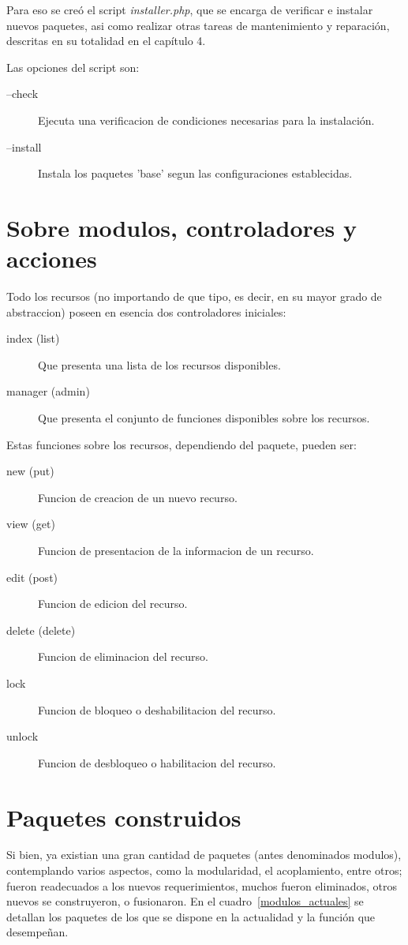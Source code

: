 Para eso se creó el script \emph{installer.php}, que se encarga de verificar e instalar nuevos paquetes, asi como
realizar otras tareas de mantenimiento y reparación, descritas en su totalidad en el capítulo 4.

Las opciones del script son:

\begin{description}
\item [--check] Ejecuta una verificacion de condiciones necesarias para la instalación.
\item [--install] Instala los paquetes 'base' segun las configuraciones establecidas.
\end{description}

\section{Sobre modulos, controladores y acciones}
Todo los recursos (no importando de que tipo, es decir, en su mayor grado de abstraccion) poseen en esencia dos
controladores iniciales:

\begin{description}
\item [index (list)] Que presenta una lista de los recursos disponibles.
\item [manager (admin)] Que presenta el conjunto de funciones disponibles sobre los recursos.
\end{description}

Estas funciones sobre los recursos, dependiendo del paquete, pueden ser:

\begin{description}
\item [new (put)] Funcion de creacion de un nuevo recurso.
\item [view (get)] Funcion de presentacion de la informacion de un recurso.
\item [edit (post)] Funcion de edicion del recurso.
\item [delete (delete)] Funcion de eliminacion del recurso.
\item [lock] Funcion de bloqueo o deshabilitacion del recurso.
\item [unlock] Funcion de desbloqueo o habilitacion del recurso.
\end{description}

\section{Paquetes construidos}
Si bien, ya existian una gran cantidad de paquetes (antes denominados modulos), contemplando varios aspectos, como la
modularidad, el acoplamiento, entre otros; fueron readecuados a los nuevos requerimientos, muchos fueron eliminados,
otros nuevos se construyeron, o fusionaron. En el cuadro~\ref{modulos_actuales} se detallan los paquetes de los que se
dispone en la actualidad y la función que desempeñan.

